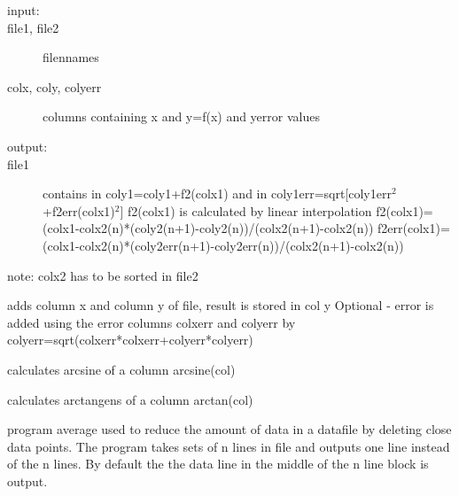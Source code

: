 \begin{description}
\begin{description}
 \item [input:]
 \item[ file1, file2]         filennames
 \item [colx, coly, colyerr]  columns containing x and y=f(x) and yerror values
\item[  output:]
\item[  file1]            contains in coly1=coly1+f2(colx1)
                   and in   coly1err=sqrt[coly1err$^2$+f2err(colx1)$^2$]
                   f2(colx1) is calculated by linear
                   interpolation
                   f2(colx1)=
                   (colx1-colx2(n)*(coly2(n+1)-coly2(n))/(colx2(n+1)-colx2(n))
                   f2err(colx1)=
                   (colx1-colx2(n)*(coly2err(n+1)-coly2err(n))/(colx2(n+1)-colx2(n))
\end{description}
  note:            colx2 has to be sorted in file2
\item [\prg addcol\index{addcol}\label{addcol}  colx{[ecolxerr]} coly{[ecolyerr]} file:] adds column x and column y of file, result is %
stored in col y
Optional - error is added using the error columns colxerr and colyerr
by colyerr=sqrt(colxerr*colxerr+colyerr*colyerr)
\item [\prg asincol\index{asincol}\label{asincol} col const file:] calculates arcsine of a column arcsine(col) 
\item [\prg atancol\index{atancol}\label{atancol} col const file:] calculates arctangens of a column %
arctan(col) 
\item [\prg average\index{average}\label{average} {[option]} n file:] program average  used  to 
 reduce the amount of data in a datafile by deleting close data points.
 The program takes sets of n lines in file and  outputs one line instead
of the n lines. By default the the data line in the middle of the n line
block is output. 
 

\end{description}
